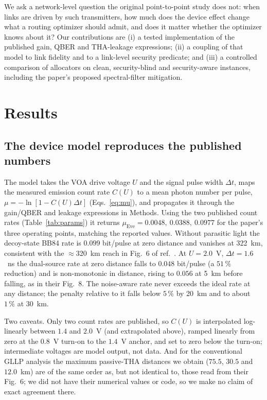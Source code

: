 \documentclass[10pt]{article}
\begin{document}
We ask a network-level question the original point-to-point study does not: when
links are driven by such transmitters, how much does the device effect change
what a routing optimizer should admit, and does it matter whether the optimizer
knows about it? Our contributions are (i) a tested implementation of the
published gain, QBER and THA-leakage expressions; (ii) a coupling of that model
to link fidelity and to a link-level security predicate; and (iii) a
controlled comparison of allocators on clean, security-blind and
security-aware instances, including the paper's proposed spectral-filter
mitigation.

\section{Results}
\subsection*{The device model reproduces the published numbers}
The model takes the VOA drive voltage $U$ and the signal pulse width $\Delta t$,
maps the measured emission count rate $C(U)$ to a mean photon number per pulse,
$\mu=-\ln[1-C(U)\Delta t]$ (Eqs.~\ref{eq:mu}), and propagates it through the
gain/QBER and leakage expressions in Methods. Using the two published count
rates (Table~\ref{tab:params}) it returns
$\mu_{\mathrm{Eve}}=0.0048,\ 0.0388,\ 0.0977$ for the paper's three operating
points, matching the reported values. Without parasitic light the decoy-state
BB84 rate is $0.099$ bit/pulse at zero distance and vanishes at
322~km, consistent with the $\approx$320~km reach in Fig.~6 of
ref.~\cite{li2026voa}. At $U=2.0$~V, $\Delta t=1.6$~ns the dual-source rate at
zero distance falls to $0.048$ bit/pulse (a $51\,\%$ reduction) and is
non-monotonic in distance, rising to $0.056$ at 5~km before falling, as in their
Fig.~8. The noise-aware rate never exceeds the ideal rate at any distance; the penalty
relative to it falls below $5\,\%$ by 20~km and to about $1\,\%$ at 30~km.

Two caveats. Only two count rates are published, so $C(U)$ is interpolated
log-linearly between $1.4$ and $2.0$~V (and extrapolated above), ramped linearly from
zero at the $0.8$~V turn-on to the $1.4$~V anchor, and set to zero below the turn-on;
intermediate voltages are model output, not data. And for the conventional GLLP
analysis the maximum passive-THA distances we obtain ($75.5$, $30.5$ and
$12.0$~km) are of the same order as, but not identical to, those read from
their Fig.~6; we did not have their numerical values or code, so we make no
claim of exact agreement there.
\end{document}
